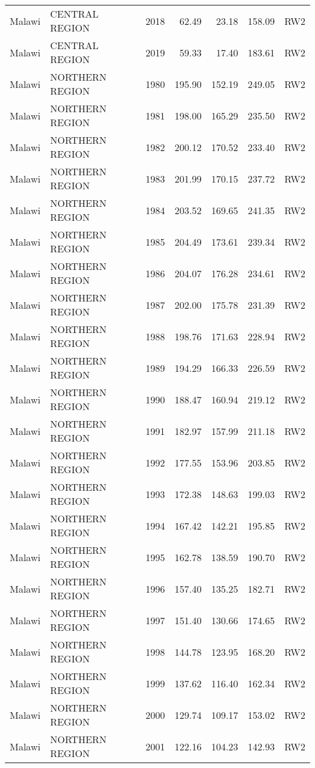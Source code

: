 \begin{longtable}{lllrrrl}
  Malawi & CENTRAL REGION & 2018 & 62.49 & 23.18 & 158.09 & RW2 \\ 
  Malawi & CENTRAL REGION & 2019 & 59.33 & 17.40 & 183.61 & RW2 \\ 
  Malawi & NORTHERN REGION & 1980 & 195.90 & 152.19 & 249.05 & RW2 \\ 
  Malawi & NORTHERN REGION & 1981 & 198.00 & 165.29 & 235.50 & RW2 \\ 
  Malawi & NORTHERN REGION & 1982 & 200.12 & 170.52 & 233.40 & RW2 \\ 
  Malawi & NORTHERN REGION & 1983 & 201.99 & 170.15 & 237.72 & RW2 \\ 
  Malawi & NORTHERN REGION & 1984 & 203.52 & 169.65 & 241.35 & RW2 \\ 
  Malawi & NORTHERN REGION & 1985 & 204.49 & 173.61 & 239.34 & RW2 \\ 
  Malawi & NORTHERN REGION & 1986 & 204.07 & 176.28 & 234.61 & RW2 \\ 
  Malawi & NORTHERN REGION & 1987 & 202.00 & 175.78 & 231.39 & RW2 \\ 
  Malawi & NORTHERN REGION & 1988 & 198.76 & 171.63 & 228.94 & RW2 \\ 
  Malawi & NORTHERN REGION & 1989 & 194.29 & 166.33 & 226.59 & RW2 \\ 
  Malawi & NORTHERN REGION & 1990 & 188.47 & 160.94 & 219.12 & RW2 \\ 
  Malawi & NORTHERN REGION & 1991 & 182.97 & 157.99 & 211.18 & RW2 \\ 
  Malawi & NORTHERN REGION & 1992 & 177.55 & 153.96 & 203.85 & RW2 \\ 
  Malawi & NORTHERN REGION & 1993 & 172.38 & 148.63 & 199.03 & RW2 \\ 
  Malawi & NORTHERN REGION & 1994 & 167.42 & 142.21 & 195.85 & RW2 \\ 
  Malawi & NORTHERN REGION & 1995 & 162.78 & 138.59 & 190.70 & RW2 \\ 
  Malawi & NORTHERN REGION & 1996 & 157.40 & 135.25 & 182.71 & RW2 \\ 
  Malawi & NORTHERN REGION & 1997 & 151.40 & 130.66 & 174.65 & RW2 \\ 
  Malawi & NORTHERN REGION & 1998 & 144.78 & 123.95 & 168.20 & RW2 \\ 
  Malawi & NORTHERN REGION & 1999 & 137.62 & 116.40 & 162.34 & RW2 \\ 
  Malawi & NORTHERN REGION & 2000 & 129.74 & 109.17 & 153.02 & RW2 \\ 
  Malawi & NORTHERN REGION & 2001 & 122.16 & 104.23 & 142.93 & RW2 \\ 

\end{longtable}
